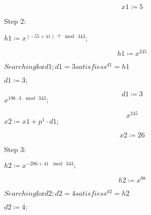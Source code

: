 \documentclass[11pt,a4paper,fleqn]{article}
\begin{document}
\begin{enumerate}[1.]
\begin{flushleft}
\begin{enumerate}
\begin{mdframed}
					\begin{dmath}\label{(6)}
						\mathit{x1} \coloneqq 5
					\end{dmath}
					\begin{Maple Normal}
						Step 2:
					\end{Maple Normal}
					\mapleinput
					{$ \displaystyle \mathit{h1} \coloneqq x^{\mathit{(-55+41)}\cdot 7\,\mod \,343}; $}
					
					\begin{dmath}\label{(7)}
						\mathit{h1} \coloneqq x^{245}
					\end{dmath}
					\begin{Maple Normal}
						{$ \displaystyle \mathit{Searching} \boldsymbol{\mathrm{for}}\mathit{d1} ;\mathit{d1} =3\mathit{satisfies} s^{\mathit{d1}}=\mathit{h1}  $}
					\end{Maple Normal}
					\mapleinput
					{$ \displaystyle \mathit{d1} \coloneqq 3; $}
					
					\begin{dmath}\label{(8)}
						\mathit{d1} \coloneqq 3
					\end{dmath}
					\mapleinput
					{$ \displaystyle x^{196\cdot 3\,\mod \,343}; $}
					
					\begin{dmath}\label{(9)}
						x^{245}
					\end{dmath}
					\mapleinput
					{$ \displaystyle \mathit{x2} \coloneqq \mathit{x1} +p^{1}\cdot \mathit{d1} ; $}
					
					\begin{dmath}\label{(10)}
						\mathit{x2} \coloneqq 26
					\end{dmath}
					\begin{Maple Normal}
						Step 3:
					\end{Maple Normal}
					\mapleinput
					{$ \displaystyle \mathit{h2} \coloneqq x^{-286+41\,\mod \,343}; $}
					
					\begin{dmath}\label{(11)}
						\mathit{h2} \coloneqq x^{98}
					\end{dmath}
					\begin{Maple Normal}
						{$ \displaystyle \mathit{Searching} \boldsymbol{\mathrm{for}}\mathit{d2} ;\mathit{d2} =4\mathit{satisfies} s^{\mathit{d2}}=\mathit{h2}  $}
					\end{Maple Normal}
					\mapleinput
					{$ \displaystyle \mathit{d2} \coloneqq 4; $}
					

\end{mdframed}
\end{enumerate}
\end{flushleft}
\end{enumerate}
\end{document}
